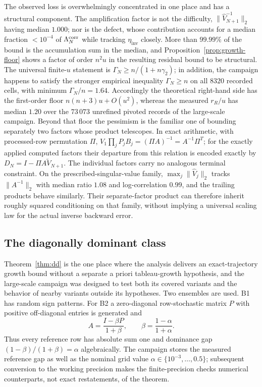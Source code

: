 \documentclass[review,onefignum,onetabnum]{siamart251216}
\begin{document}
The observed loss is overwhelmingly concentrated in one place and has a structural component. The amplification factor is not the difficulty,
$\|\widehat V_{N+1}^{-1}\|_2$ having median $1.000$; nor is the defect, whose contribution
accounts for a median fraction $<10^{-4}$ of $\Lambda_N^{\rm corr}$ while tracking
$\eta_{\mathrm{inv}}$ closely. More than $99.99\%$ of the bound is the accumulation sum in the median, and
Proposition~\ref{prop:growth-floor} shows a factor of order $n^2u$ in the resulting residual bound
to be structural. The universal finite-$u$ statement is
$\Gamma_N\ge n/(1+n\gamma_2)$; in addition, the campaign happens to satisfy the stronger empirical
inequality $\Gamma_N\ge n$ on all $8320$ recorded cells, with minimum $\Gamma_N/n=1.64$.
Accordingly the theoretical right-hand side has the first-order floor $n(n+3)u+O(u^2)$, whereas
the measured $r_R/u$ has median $1.20$ over the $73\,073$ unrefined pivoted records of the
large-scale campaign. Beyond that floor the pessimism is the familiar one of bounding separately
two factors whose product telescopes. In exact arithmetic, with processed-row permutation $\Pi$,
$V_1\prod_jP_jB_j=(\Pi A)^{-1}=A^{-1}\Pi^T$; for the exactly applied computed factors their
departure from this relation is encoded exactly by $D_N=I-\Pi A\widetilde V_{N+1}$. The
individual factors carry no analogous terminal constraint. On the prescribed-singular-value
family, $\max_j\|\widehat V_j\|_2$ tracks $\|A^{-1}\|_2$ with median ratio $1.08$ and
log-correlation $0.99$, and the trailing products behave similarly. Their separate-factor product
can therefore inherit roughly squared conditioning on that family, without implying a universal
scaling law for the actual inverse backward error.

\subsection{The diagonally dominant class}
\label{sec:dd-numerics}

Theorem~\ref{thm:dd} is the one place where the analysis delivers an exact-trajectory growth
bound without a separate a priori tableau-growth hypothesis, and the large-scale campaign was
designed to test both its covered variants and the behavior of nearby variants outside its
hypotheses. Two ensembles are used. B1 has random sign patterns. For B2 a zero-diagonal row-stochastic matrix $P$ with positive off-diagonal entries is generated and
\[
A=\frac{I-\beta P}{1+\beta},
\qquad
\beta=\frac{1-\alpha}{1+\alpha}.
\]
Thus every reference row has absolute sum one and dominance gap
$(1-\beta)/(1+\beta)=\alpha$ algebraically. The campaign stores the measured reference gap as well
as the nominal grid value $\alpha\in\{10^{-3},\dots,0.5\}$; subsequent conversion to the working
precision makes the finite-precision checks numerical counterparts, not exact restatements, of the
theorem.
\end{document}
